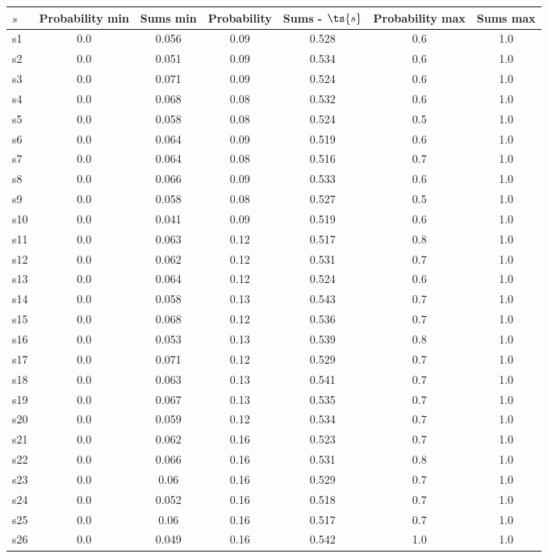 \documentclass{article}
\begin{document}
\noindent\begin{tabular}{|l|c|c|c|c|c|c|}
\hline
$s$& Probability min & Sums min & Probability & Sums - $\ts{s}$ & Probability max & Sums max\\
\hline
s1 &0.0 & 0.056 & 0.09 & 0.528 & 0.6 & 1.0\\
\hline
s2 &0.0 & 0.051 & 0.09 & 0.534 & 0.6 & 1.0\\
\hline
s3 &0.0 & 0.071 & 0.09 & 0.524 & 0.6 & 1.0\\
\hline
s4 &0.0 & 0.068 & 0.08 & 0.532 & 0.6 & 1.0\\
\hline
s5 &0.0 & 0.058 & 0.08 & 0.524 & 0.5 & 1.0\\
\hline
s6 &0.0 & 0.064 & 0.09 & 0.519 & 0.6 & 1.0\\
\hline
s7 &0.0 & 0.064 & 0.08 & 0.516 & 0.7 & 1.0\\
\hline
s8 &0.0 & 0.066 & 0.09 & 0.533 & 0.6 & 1.0\\
\hline
s9 &0.0 & 0.058 & 0.08 & 0.527 & 0.5 & 1.0\\
\hline
s10 &0.0 & 0.041 & 0.09 & 0.519 & 0.6 & 1.0\\
\hline
s11 &0.0 & 0.063 & 0.12 & 0.517 & 0.8 & 1.0\\
\hline
s12 &0.0 & 0.062 & 0.12 & 0.531 & 0.7 & 1.0\\
\hline
s13 &0.0 & 0.064 & 0.12 & 0.524 & 0.6 & 1.0\\
\hline
s14 &0.0 & 0.058 & 0.13 & 0.543 & 0.7 & 1.0\\
\hline
s15 &0.0 & 0.068 & 0.12 & 0.536 & 0.7 & 1.0\\
\hline
s16 &0.0 & 0.053 & 0.13 & 0.539 & 0.8 & 1.0\\
\hline
s17 &0.0 & 0.071 & 0.12 & 0.529 & 0.7 & 1.0\\
\hline
s18 &0.0 & 0.063 & 0.13 & 0.541 & 0.7 & 1.0\\
\hline
s19 &0.0 & 0.067 & 0.13 & 0.535 & 0.7 & 1.0\\
\hline
s20 &0.0 & 0.059 & 0.12 & 0.534 & 0.7 & 1.0\\
\hline
s21 &0.0 & 0.062 & 0.16 & 0.523 & 0.7 & 1.0\\
\hline
s22 &0.0 & 0.066 & 0.16 & 0.531 & 0.8 & 1.0\\
\hline
s23 &0.0 & 0.06 & 0.16 & 0.529 & 0.7 & 1.0\\
\hline
s24 &0.0 & 0.052 & 0.16 & 0.518 & 0.7 & 1.0\\
\hline
s25 &0.0 & 0.06 & 0.16 & 0.517 & 0.7 & 1.0\\
\hline
s26 &0.0 & 0.049 & 0.16 & 0.542 & 1.0 & 1.0\\

\end{tabular}
\end{document}
